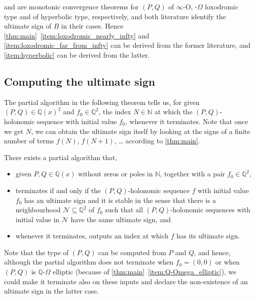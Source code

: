 \documentclass[a4paper,UKenglish,cleveref,autoref,thm-restate]{lipics-v2021}
\newcommand{\N}{\mathbb{N}}
\newcommand{\Q}{\mathbb{Q}}
\begin{document}
\cite[Theorems 3.12 and 3.13]{LW08} and \cite[Lemma 3.4]{KKL+21} are monotonic convergence theorems for $(P, Q)$ of $\infty$-O, -$\Omega$ loxodromic type and of hyperbolic type, respectively, and both literature identify the ultimate sign of $B$ in their cases. Hence \cref{thm:main}~\eqref{item:loxodromic_nearly_infty} and \eqref{item:loxodromic_far_from_infty} can be derived from the former literature, and \eqref{item:hyperbolic} can be derived from the latter. 










\subsection{Computing the ultimate sign}
\label{subsection: main result algorithm}

The partial algorithm in the following theorem tells us, for given $(P, Q) \in \Q(x)^2$ and $f_0 \in \Q^2$, the index $N \in \N$ at which the $(P, Q)$-holonomic sequence with initial value $f_0$, whenever it terminates. 
Note that once we get $N$, 
we can obtain the ultimate sign itself
by looking at the signs of 
a finite number of terms $f (N)$, $f (N + 1)$, \ldots
according to \cref{thm:main}. 

\begin{theorem}\label{thm:procedure}
There exists a partial algorithm that, 
\begin{itemize}
\item 
given 
$P, Q \in \Q(x)$ without zeros or poles in $\N$, 
together with a pair $f_0 \in \Q^2$,
\item 
terminates if and only if 
the $(P, Q)$-holonomic sequence $f$ with initial value $f_0$
has an ultimate sign
and it is stable 
in the sense that there is a neighbourhood $\mathcal{N} \subseteq \Q^2$ of $f_0$
such that all $(P, Q)$-holonomic sequences with initial value in $\mathcal{N}$ have the same ultimate sign, 
and
\item 
whenever it terminates, 
outputs an index at which $f$ has its ultimate sign.
\end{itemize}
\end{theorem}

Note that the type of $(P, Q)$ can be computed from $P$ and $Q$, 
and hence, 
although the partial algorithm does not terminate
when $f_0 = (0, 0)$ or when $(P, Q)$ is $\Q$-$\Omega$ elliptic
(because of \cref{thm:main}~\eqref{item:Q-Omega_elliptic}), 
we could make it terminate also on these inputs
and declare the non-existence of an ultimate sign in the latter case. 
\end{document}
